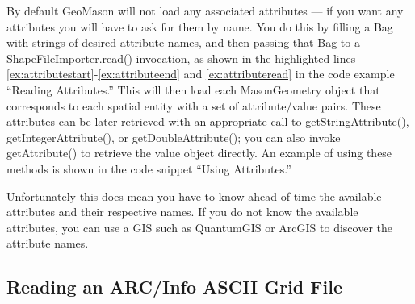 \documentclass[twoside,10pt]{book}
\newcommand\class[1]{\index{Classes!{#1}}\textsf{#1}}
\newcommand\method[1]{\textsf{#1}}
\newcommand\code[1]{\textsf{#1}}
\begin{document}
\begin{description}
By default GeoMason will not load any associated attributes --- if you
want any attributes you will have to ask for them by name.  You do
this by filling a \code{Bag} with strings of desired attribute names,
and then passing that \code{Bag} to a
\method{ShapeFileImporter.read()} invocation, as shown in the
highlighted lines
\ref{ex:attributestart}-\ref{ex:attributeend} and
\ref{ex:attributeread} in the code example ``Reading Attributes.'' This will then load
each \class{MasonGeometry} object that corresponds to each spatial
entity with a set of attribute/value pairs.  These attributes can be
later retrieved with an appropriate call to
\method{getStringAttribute()}, \method{getIntegerAttribute()}, or
\method{getDoubleAttribute()}; you can also invoke
\method{getAttribute()} to retrieve the value object directly.  An
example of using these methods is shown in the code snippet ``Using Attributes.''

Unfortunately this does mean you have to know ahead of time the
available attributes and their respective names.  If you do not know
the available attributes, you can use a GIS such as QuantumGIS or
ArcGIS to discover the attribute names.
\end{description}






\subsection{Reading an ARC/Info ASCII Grid File}
\label{sub:readinggridfile}
\end{document}
